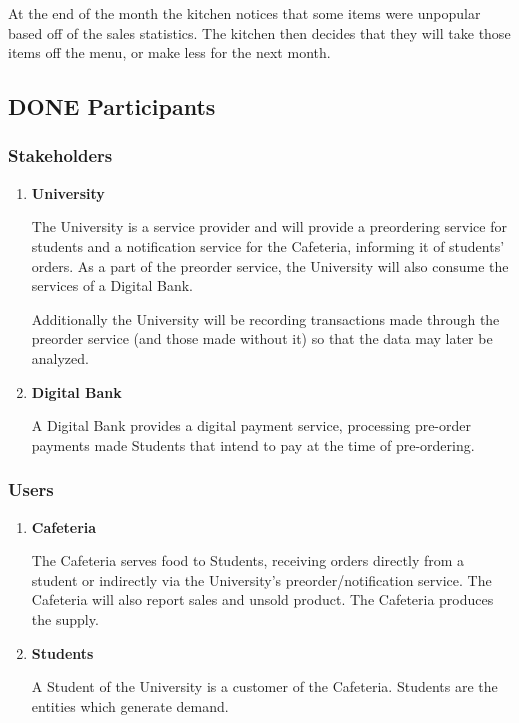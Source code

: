 \documentclass[11pt]{article}
\begin{document}
At the end of the month the kitchen notices that some items were
unpopular based off of the sales statistics. The kitchen then
decides that they will take those items off the menu, or make less
for the next month.
\subsection{{\bfseries\sffamily DONE} Participants}
\label{sec:org0cf8f10}
\subsubsection{Stakeholders}
\label{sec:orgcf4ff6b}
\begin{enumerate}
\item \textbf{University}
\label{sec:org90758c4}

The University is a service provider and will provide a
preordering service for students and a notification service for
the Cafeteria, informing it of students' orders. As a part of the
preorder service, the University will also consume the services
of a Digital Bank.

Additionally the University will be recording transactions made
through the preorder service (and those made without it) so that
the data may later be analyzed.

\item \textbf{Digital Bank}
\label{sec:org9b30b10}

A Digital Bank provides a digital payment service, processing
pre-order payments made Students that intend to pay at the time
of pre-ordering.
\end{enumerate}

\subsubsection{Users}
\label{sec:org58360e4}
\begin{enumerate}
\item \textbf{Cafeteria}
\label{sec:orgc3f3078}

The Cafeteria serves food to Students, receiving orders directly
from a student or indirectly via the University's
preorder/notification service. The Cafeteria will also report
sales and unsold product. The Cafeteria produces the supply.

\item \textbf{Students}
\label{sec:org97d47fa}

A Student of the University is a customer of the
Cafeteria. Students are the entities which generate demand.
\end{enumerate}
\end{document}

